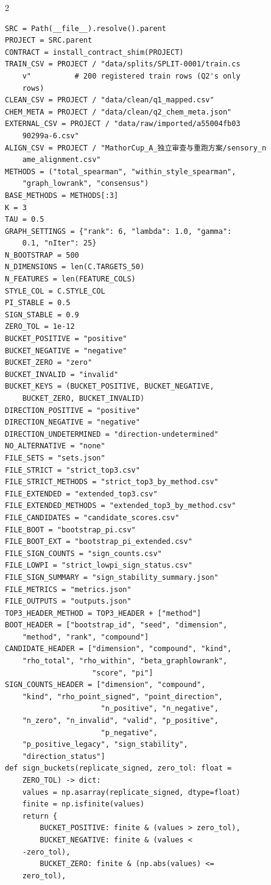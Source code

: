\begin{multicols}{2}
\begin{Verbatim}[fontsize=\scriptsize]
SRC = Path(__file__).resolve().parent
PROJECT = SRC.parent
CONTRACT = install_contract_shim(PROJECT)
TRAIN_CSV = PROJECT / "data/splits/SPLIT-0001/train.cs
    v"          # 200 registered train rows (Q2's only
    rows)
CLEAN_CSV = PROJECT / "data/clean/q1_mapped.csv"
CHEM_META = PROJECT / "data/clean/q2_chem_meta.json"
EXTERNAL_CSV = PROJECT / "data/raw/imported/a55004fb03
    90299a-6.csv"
ALIGN_CSV = PROJECT / "MathorCup_A_独立审查与重跑方案/sensory_n
    ame_alignment.csv"
METHODS = ("total_spearman", "within_style_spearman",
    "graph_lowrank", "consensus")
BASE_METHODS = METHODS[:3]
K = 3
TAU = 0.5
GRAPH_SETTINGS = {"rank": 6, "lambda": 1.0, "gamma":
    0.1, "nIter": 25}
N_BOOTSTRAP = 500
N_DIMENSIONS = len(C.TARGETS_50)
N_FEATURES = len(FEATURE_COLS)
STYLE_COL = C.STYLE_COL
PI_STABLE = 0.5
SIGN_STABLE = 0.9
ZERO_TOL = 1e-12
BUCKET_POSITIVE = "positive"
BUCKET_NEGATIVE = "negative"
BUCKET_ZERO = "zero"
BUCKET_INVALID = "invalid"
BUCKET_KEYS = (BUCKET_POSITIVE, BUCKET_NEGATIVE,
    BUCKET_ZERO, BUCKET_INVALID)
DIRECTION_POSITIVE = "positive"
DIRECTION_NEGATIVE = "negative"
DIRECTION_UNDETERMINED = "direction-undetermined"
NO_ALTERNATIVE = "none"
FILE_SETS = "sets.json"
FILE_STRICT = "strict_top3.csv"
FILE_STRICT_METHODS = "strict_top3_by_method.csv"
FILE_EXTENDED = "extended_top3.csv"
FILE_EXTENDED_METHODS = "extended_top3_by_method.csv"
FILE_CANDIDATES = "candidate_scores.csv"
FILE_BOOT = "bootstrap_pi.csv"
FILE_BOOT_EXT = "bootstrap_pi_extended.csv"
FILE_SIGN_COUNTS = "sign_counts.csv"
FILE_LOWPI = "strict_lowpi_sign_status.csv"
FILE_SIGN_SUMMARY = "sign_stability_summary.json"
FILE_METRICS = "metrics.json"
FILE_OUTPUTS = "outputs.json"
TOP3_HEADER_METHOD = TOP3_HEADER + ["method"]
BOOT_HEADER = ["bootstrap_id", "seed", "dimension",
    "method", "rank", "compound"]
CANDIDATE_HEADER = ["dimension", "compound", "kind",
    "rho_total", "rho_within", "beta_graphlowrank",
                    "score", "pi"]
SIGN_COUNTS_HEADER = ["dimension", "compound",
    "kind", "rho_point_signed", "point_direction",
                      "n_positive", "n_negative",
    "n_zero", "n_invalid", "valid", "p_positive",
                      "p_negative",
    "p_positive_legacy", "sign_stability",
    "direction_status"]
def sign_buckets(replicate_signed, zero_tol: float =
    ZERO_TOL) -> dict:
    values = np.asarray(replicate_signed, dtype=float)
    finite = np.isfinite(values)
    return {
        BUCKET_POSITIVE: finite & (values > zero_tol),
        BUCKET_NEGATIVE: finite & (values <
    -zero_tol),
        BUCKET_ZERO: finite & (np.abs(values) <=
    zero_tol),

\end{Verbatim}
\end{multicols}
